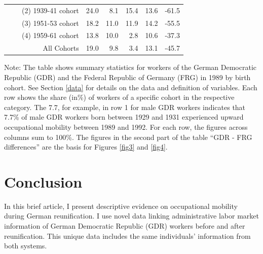 \begin{Article}
\begin{refsection}[Spitz]
\begin{landscape}
\begin{table}[]
{\begin{tabular}{lll*5{r}}
\multicolumn{1}{r}{} & \multicolumn{1}{r}{} & \multicolumn{1}{r}{(2) 1939-41 cohort} & \multicolumn{1}{r}{24.0} & \multicolumn{1}{r}{8.1} & \multicolumn{1}{r}{15.4} & \multicolumn{1}{r}{13.6} & -61.5 \\ \cline{3-8} 
\multicolumn{1}{r}{} & \multicolumn{1}{r}{} & \multicolumn{1}{r}{(3) 1951-53 cohort} & \multicolumn{1}{r}{18.2} & \multicolumn{1}{r}{11.0} & \multicolumn{1}{r}{11.9} & \multicolumn{1}{r}{14.2} & -55.5 \\ \cline{3-8} 
\multicolumn{1}{r}{} & \multicolumn{1}{r}{} & \multicolumn{1}{r}{(4) 1959-61 cohort} & \multicolumn{1}{r}{13.8} & \multicolumn{1}{r}{10.0} & \multicolumn{1}{r}{2.8} & \multicolumn{1}{r}{10.6} & -37.3 \\ \cline{3-8} 
\multicolumn{1}{r}{} & \multicolumn{1}{r}{} & \multicolumn{1}{r}{All Cohorts} & \multicolumn{1}{r}{19.0} & \multicolumn{1}{r}{9.8} & \multicolumn{1}{r}{3.4} & \multicolumn{1}{r}{13.1} & -45.7 \\ \hline
\end{tabular}}

\vspace{0.3cm}
\parbox[h]{\linewidth}{\footnotesize{Note: The table shows summary statistics for workers of the German Democratic Republic (GDR) and the Federal Republic of Germany (FRG) in 1989 by birth cohort. See Section \ref{data} for details on the data and definition of variables. Each row shows the share (in\%) of workers of a specific cohort in the respective category. The 7.7, for example, in row 1 for male GDR workers indicates that 7.7\% of male GDR workers born between 1929 and 1931 experienced upward occupational mobility between 1989 and 1992. For each row, the figures across columns sum to 100\%. The figures in the second part of the table ``GDR - FRG differences'' are the basis for Figures \ref{fig3} and \ref{fig4}.}}
\end{table}
\end{landscape}



\section{Conclusion}\label{Concl}

In this brief article, I present descriptive evidence on occupational mobility during German reunification. I use novel data linking administrative labor market information of German Democratic Republic (GDR) workers before and after reunification. This unique data includes the same individuals' information from both systems.


\end{refsection}
\end{Article}
